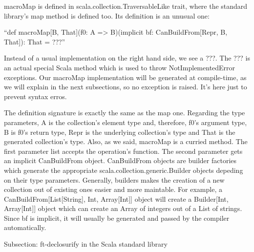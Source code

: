 macroMap is defined in scala.collection.TraversableLike trait, where the
standard library's map method is defined too. Its definition is an unusual one:

``def macroMap[B, That](f0: A => B)(implicit bf: CanBuildFrom[Repr, B, That]):
That = ???''

Instead of a usual implementation on the right hand side, we see a ???. The ???
is an actual special Scala method which is used to throw NotImplementedError
exceptions. Our macroMap implementation will be generated at compile-time, as
we will explain in the next subsections, so no exception is raised. It's here
just to prevent syntax erros. 

The definition signature is exactly the same as the map one. Regarding the
type parameters, A is the collection's element type and, therefore, f0's
argument type, B is f0's return type, Repr is the underlying collection's type
and That is the generated collection's type. Also, as we said, macroMap is a
curried method. The first parameter list accepts the operation's function. The
second parameter gets an implicit CanBuildFrom object. CanBuildFrom objects are
builder factories which generate the appropriate
scala.collection.generic.Builder objects depeding on their type parameters.
Generally, builders makes the creation of a new collection out of existing ones
easier and more maintable. For example, a CanBuildFrom[List[String], Int,
Array[Int]] object will create a Builder[Int, Array[Int]] object which can
create an Array of integers out of a List of strings. Since bf is implicit, it
will usually be generated and passed by the compiler automatically.


Subsection: ft-declosurify in the Scala standard library


